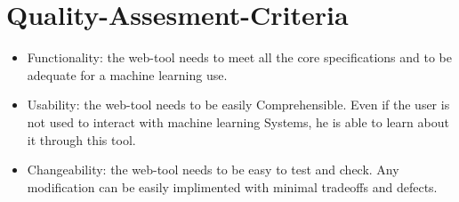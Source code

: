 
\section{Quality-Assesment-Criteria }

%
\newpage

\begin{itemize}
  \item  Functionality: the web-tool needs to meet all the core specifications and to be adequate for a machine learning use.
  \item  Usability: the web-tool needs to be easily Comprehensible. Even if the user is not used to interact with machine learning Systems, he is able to learn about it through this tool.
 \item   Changeability: the web-tool needs to be easy to test and check. Any modification can be easily implimented with minimal tradeoffs and defects.
\end{itemize}



   
    